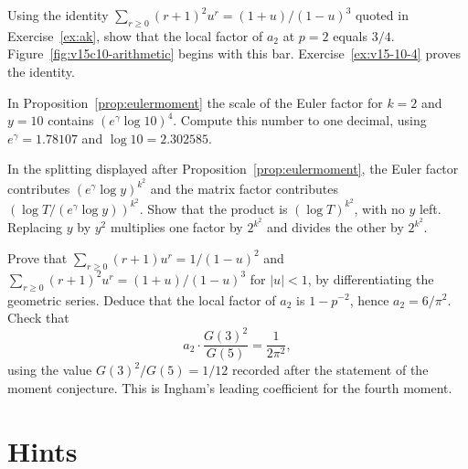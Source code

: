 \begin{exercise}[$\star$]\label{ex:v15-10-1}
Using the identity \(\sum_{r\ge0}(r+1)^2u^r=(1+u)/(1-u)^3\) quoted in Exercise~\ref{ex:ak}, show that the local factor of \(a_2\) at \(p=2\) equals \(3/4\). Figure~\ref{fig:v15c10-arithmetic} begins with this bar. Exercise~\ref{ex:v15-10-4} proves the identity.
\end{exercise}

\begin{exercise}[$\star$]\label{ex:v15-10-2}
In Proposition~\ref{prop:eulermoment} the scale of the Euler factor for \(k=2\) and \(y=10\) contains \((e^{\gamma}\log10)^{4}\). Compute this number to one decimal, using \(e^{\gamma}=1.78107\) and \(\log10=2.302585\).
\end{exercise}

\begin{exercise}[$\star$]\label{ex:v15-10-3}
In the splitting displayed after Proposition~\ref{prop:eulermoment}, the Euler factor contributes \((e^{\gamma}\log y)^{k^2}\) and the matrix factor contributes \((\log T/(e^{\gamma}\log y))^{k^2}\). Show that the product is \((\log T)^{k^2}\), with no \(y\) left. Replacing \(y\) by \(y^2\) multiplies one factor by \(2^{k^2}\) and divides the other by \(2^{k^2}\).
\end{exercise}

\begin{exercise}[$\star\star\star$]\label{ex:v15-10-4}
Prove that \(\sum_{r\ge0}(r+1)u^r=1/(1-u)^2\) and \(\sum_{r\ge0}(r+1)^2u^r=(1+u)/(1-u)^3\) for \(|u|<1\), by differentiating the geometric series. Deduce that the local factor of \(a_2\) is \(1-p^{-2}\), hence \(a_2=6/\pi^2\). Check that
\[
a_2\cdot\frac{G(3)^2}{G(5)}=\frac1{2\pi^2},
\]
using the value \(G(3)^2/G(5)=1/12\) recorded after the statement of the moment conjecture. This is Ingham's leading coefficient for the fourth moment.
\end{exercise}

\section{Hints}

